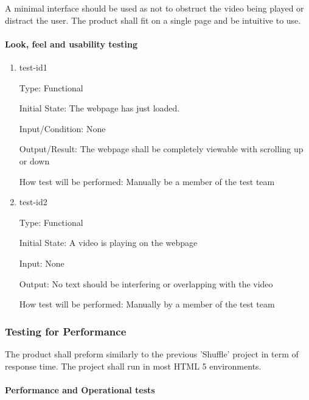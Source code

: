 \documentclass[12pt, titlepage]{article}
\begin{document}
A minimal interface should be used as not to obstruct the video being played or distract the user.  The product shall fit on a single page and be intuitive to use.
		
\paragraph{Look, feel and usability testing}

\begin{enumerate}

\item{test-id1\\}

Type: Functional
					
Initial State: The webpage has just loaded.
					
Input/Condition: None
					
Output/Result: The webpage shall be completely viewable with scrolling up or down
					
How test will be performed: Manually be a member of the test team
					
\item{test-id2\\}

Type: Functional
					
Initial State: A video is playing on the webpage
					
Input: None
					
Output: No text should be interfering or overlapping with the video
					
How test will be performed: Manually by a member of the test team

\end{enumerate}

\subsubsection{Testing for Performance}

The product shall preform similarly to the previous 'Shuffle' project in term of response time.  The project shall run in most HTML 5 environments.

\paragraph{Performance and Operational tests}
\end{document}
